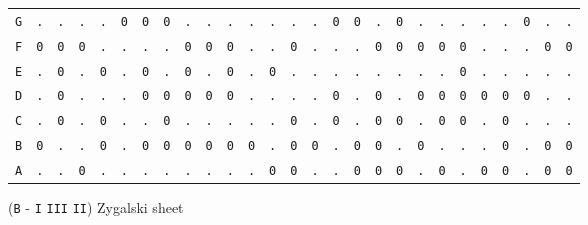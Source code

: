 \begin{figure}[H]
\begin{center}
{\begin{tabular}{c|cccccccccccccccccccccccccc}
				\texttt{G} & \texttt{.} & \texttt{.} & \texttt{.} & \texttt{.} & \texttt{0} & \texttt{0} & \texttt{0} & \texttt{.} & \texttt{.} & \texttt{.} & \texttt{.} & \texttt{.} & \texttt{.} & \texttt{.} & \texttt{0} & \texttt{0} & \texttt{.} & \texttt{0} & \texttt{.} & \texttt{.} & \texttt{.} & \texttt{.} & \texttt{.} & \texttt{0} & \texttt{.} & \texttt{.} \\
				\texttt{F} & \texttt{0} & \texttt{0} & \texttt{0} & \texttt{.} & \texttt{.} & \texttt{.} & \texttt{.} & \texttt{0} & \texttt{0} & \texttt{0} & \texttt{.} & \texttt{.} & \texttt{0} & \texttt{.} & \texttt{.} & \texttt{.} & \texttt{0} & \texttt{0} & \texttt{0} & \texttt{0} & \texttt{0} & \texttt{.} & \texttt{.} & \texttt{.} & \texttt{0} & \texttt{0} \\
				\texttt{E} & \texttt{.} & \texttt{0} & \texttt{.} & \texttt{0} & \texttt{.} & \texttt{0} & \texttt{.} & \texttt{0} & \texttt{.} & \texttt{0} & \texttt{.} & \texttt{0} & \texttt{.} & \texttt{.} & \texttt{.} & \texttt{.} & \texttt{.} & \texttt{.} & \texttt{.} & \texttt{.} & \texttt{0} & \texttt{.} & \texttt{.} & \texttt{.} & \texttt{.} & \texttt{.} \\
				\texttt{D} & \texttt{.} & \texttt{0} & \texttt{.} & \texttt{.} & \texttt{.} & \texttt{0} & \texttt{0} & \texttt{0} & \texttt{0} & \texttt{0} & \texttt{.} & \texttt{.} & \texttt{.} & \texttt{.} & \texttt{0} & \texttt{.} & \texttt{0} & \texttt{.} & \texttt{0} & \texttt{0} & \texttt{0} & \texttt{0} & \texttt{0} & \texttt{0} & \texttt{.} & \texttt{.} \\
				\texttt{C} & \texttt{.} & \texttt{0} & \texttt{.} & \texttt{0} & \texttt{.} & \texttt{.} & \texttt{0} & \texttt{.} & \texttt{.} & \texttt{.} & \texttt{.} & \texttt{.} & \texttt{0} & \texttt{.} & \texttt{0} & \texttt{.} & \texttt{0} & \texttt{0} & \texttt{.} & \texttt{0} & \texttt{0} & \texttt{.} & \texttt{0} & \texttt{.} & \texttt{.} & \texttt{.} \\
				\texttt{B} & \texttt{0} & \texttt{.} & \texttt{.} & \texttt{0} & \texttt{.} & \texttt{0} & \texttt{0} & \texttt{0} & \texttt{0} & \texttt{0} & \texttt{0} & \texttt{.} & \texttt{0} & \texttt{0} & \texttt{.} & \texttt{0} & \texttt{0} & \texttt{.} & \texttt{0} & \texttt{.} & \texttt{.} & \texttt{.} & \texttt{0} & \texttt{.} & \texttt{0} & \texttt{0} \\
				\texttt{A} & \texttt{.} & \texttt{.} & \texttt{0} & \texttt{.} & \texttt{.} & \texttt{.} & \texttt{.} & \texttt{.} & \texttt{.} & \texttt{.} & \texttt{.} & \texttt{0} & \texttt{0} & \texttt{.} & \texttt{.} & \texttt{0} & \texttt{0} & \texttt{0} & \texttt{.} & \texttt{0} & \texttt{.} & \texttt{0} & \texttt{0} & \texttt{.} & \texttt{0} & \texttt{0} \\
			\end{tabular}}
	\end{center}
	\caption{(\texttt{B} - \texttt{I} \texttt{III} \texttt{II}) Zygalski sheet}
	\label{fig:zygalski_sheet}
\end{figure}
